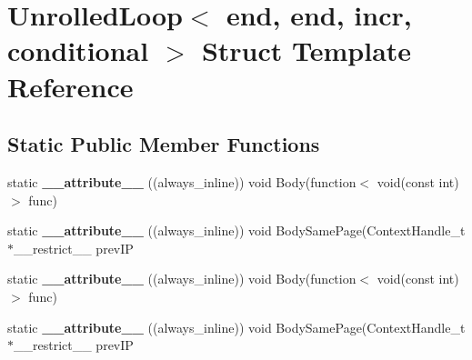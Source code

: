 \hypertarget{structUnrolledLoop_3_01end_00_01end_00_01incr_00_01conditional_01_4}{\section{Unrolled\-Loop$<$ end, end, incr, conditional $>$ Struct Template Reference}
\label{structUnrolledLoop_3_01end_00_01end_00_01incr_00_01conditional_01_4}
}
\subsection*{Static Public Member Functions}
\begin{DoxyCompactItemize}
\item 
\hypertarget{structUnrolledLoop_3_01end_00_01end_00_01incr_00_01conditional_01_4_a48cda06f7afb6af36cea580827de978a}{static {\bfseries \-\_\-\-\_\-attribute\-\_\-\-\_\-} ((always\-\_\-inline)) void Body(function$<$ void(const int)$>$ func)}\label{structUnrolledLoop_3_01end_00_01end_00_01incr_00_01conditional_01_4_a48cda06f7afb6af36cea580827de978a}

\item 
\hypertarget{structUnrolledLoop_3_01end_00_01end_00_01incr_00_01conditional_01_4_af4620c70c2a290a7301d25ceb8d19918}{static {\bfseries \-\_\-\-\_\-attribute\-\_\-\-\_\-} ((always\-\_\-inline)) void Body\-Same\-Page(Context\-Handle\-\_\-t $\ast$\-\_\-\-\_\-restrict\-\_\-\-\_\- prev\-I\-P}\label{structUnrolledLoop_3_01end_00_01end_00_01incr_00_01conditional_01_4_af4620c70c2a290a7301d25ceb8d19918}

\item 
\hypertarget{structUnrolledLoop_3_01end_00_01end_00_01incr_00_01conditional_01_4_a48cda06f7afb6af36cea580827de978a}{static {\bfseries \-\_\-\-\_\-attribute\-\_\-\-\_\-} ((always\-\_\-inline)) void Body(function$<$ void(const int)$>$ func)}\label{structUnrolledLoop_3_01end_00_01end_00_01incr_00_01conditional_01_4_a48cda06f7afb6af36cea580827de978a}

\item 
\hypertarget{structUnrolledLoop_3_01end_00_01end_00_01incr_00_01conditional_01_4_af4620c70c2a290a7301d25ceb8d19918}{static {\bfseries \-\_\-\-\_\-attribute\-\_\-\-\_\-} ((always\-\_\-inline)) void Body\-Same\-Page(Context\-Handle\-\_\-t $\ast$\-\_\-\-\_\-restrict\-\_\-\-\_\- prev\-I\-P}\label{structUnrolledLoop_3_01end_00_01end_00_01incr_00_01conditional_01_4_af4620c70c2a290a7301d25ceb8d19918}

\end{DoxyCompactItemize}
